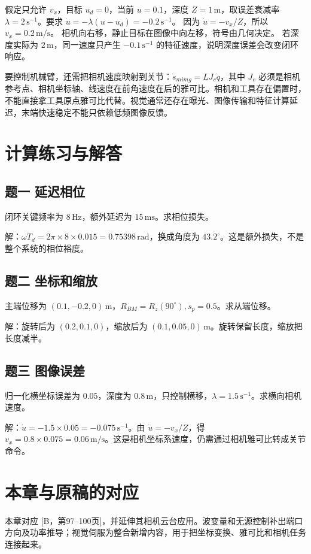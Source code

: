 \begin{examplebox}[只沿相机横向移动]
假定只允许 $v_x$，目标 $u_d=0$，当前 $u=0.1$，深度 $Z=1\,\mathrm m$，取误差衰减率 $\lambda=2\,\mathrm{s^{-1}}$。要求 $\dot u=-\lambda(u-u_d)=-0.2\,\mathrm{s^{-1}}$。
因为 $\dot u=-v_x/Z$，所以 $v_x=0.2\,\mathrm{m/s}$。
相机向右移，静止目标在图像中向左移，符号由几何决定。
若深度实际为 $2\,\mathrm m$，同一速度只产生 $-0.1\,\mathrm{s^{-1}}$ 的特征速度，说明深度误差会改变闭环响应。
\end{examplebox}

要控制机械臂，还需把相机速度映射到关节：$\dot s_{
m img}=LJ_c\dot q$，其中 $J_c$ 必须是相机参考点、相机坐标轴、线速度在前角速度在后的雅可比。相机和工具存在偏置时，不能直接拿工具原点雅可比代替。视觉通常还存在曝光、图像传输和特征计算延迟，末端快速稳定不能只依赖低频图像反馈。

\section{计算练习与解答}

\subsection*{题一 延迟相位}
闭环关键频率为 $8\,\mathrm{Hz}$，额外延迟为 $15\,\mathrm{ms}$。求相位损失。

解：$\omega T_d=2\pi\times8\times0.015=0.75398\,\mathrm{rad}$，换成角度为 $43.2^\circ$。这是额外损失，不是整个系统的相位裕度。

\subsection*{题二 坐标和缩放}
主端位移为 $(0.1,-0.2,0)\,\mathrm m$，$R_{BM}=R_z(90^\circ),s_p=0.5$。求从端位移。

解：旋转后为 $(0.2,0.1,0)$，缩放后为 $(0.1,0.05,0)\,\mathrm m$。旋转保留长度，缩放把长度减半。

\subsection*{题三 图像误差}
归一化横坐标误差为 $0.05$，深度为 $0.8\,\mathrm m$，只控制横移，$\lambda=1.5\,\mathrm{s^{-1}}$。求横向相机速度。

解：$\dot u=-1.5\times0.05=-0.075\,\mathrm{s^{-1}}$。由 $\dot u=-v_x/Z$，得 $v_x=0.8\times0.075=0.06\,\mathrm{m/s}$。这是相机坐标系速度，仍需通过相机雅可比转成关节命令。

\section*{本章与原稿的对应}
本章对应 [B，第97--100页]，并延伸其相机云台应用。波变量和无源控制补出端口方向及功率推导；视觉伺服为整合新增内容，用于把坐标变换、雅可比和相机任务连接起来。
